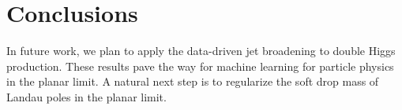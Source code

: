 \section{Conclusions}\label{sec:conclusions}

In future work, we plan to apply the data-driven jet broadening to
double Higgs production. These results pave the way for machine learning
for particle physics in the planar limit. A natural next step is to
regularize the soft drop mass of Landau poles in the planar limit.

